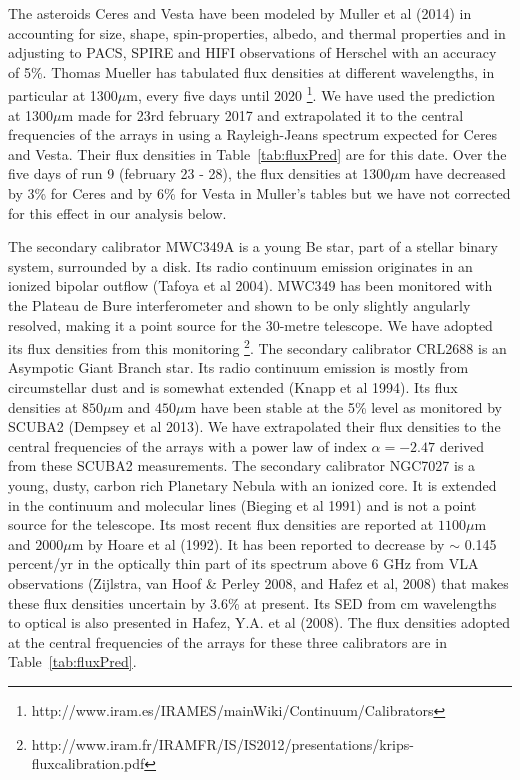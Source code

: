 The asteroids Ceres and Vesta have been modeled by Muller et al (2014) in accounting for 
size, shape, spin-properties, albedo, and thermal properties and in adjusting to PACS, SPIRE and HIFI observations
of Herschel with an accuracy of 5\%. 
Thomas Mueller has tabulated flux densities at different wavelengths, in particular at 1300$\mu$m, every five days
until 2020 \footnote{http://www.iram.es/IRAMES/mainWiki/Continuum/Calibrators}.
We have used the prediction at  1300$\mu$m made for  23rd february 2017
and extrapolated it  to the central frequencies of the arrays in using a Rayleigh-Jeans
spectrum expected for Ceres and Vesta. Their flux densities in
Table~\ref{tab:fluxPred} are for this date. Over the five days of  run 9 (february 23 - 28), the
flux densities  at 1300$\mu$m  have decreased by  3\% 
for Ceres and  by 6\%  for Vesta in Muller's tables but we have not corrected for this effect in our analysis below.  

The secondary calibrator MWC349A is a young Be star, part of a stellar binary system, surrounded by a disk. Its radio
continuum emission originates in an ionized bipolar outflow (Tafoya et al 2004).
MWC349 has been monitored with the  Plateau de Bure interferometer
and shown to be only slightly angularly resolved, making it a point source for the 30-metre telescope. We have adopted
its flux densities from this monitoring \footnote{http://www.iram.fr/IRAMFR/IS/IS2012/presentations/krips-fluxcalibration.pdf}.
The secondary calibrator CRL2688 is an Asympotic Giant Branch star. Its radio continuum emission is mostly from circumstellar dust and
is somewhat extended  (Knapp et al 1994).
Its flux densities at $850\mu$m  and $450\mu$m  have been stable at the 5\% level as monitored by SCUBA2 (Dempsey et al 2013).
We have extrapolated their flux densities to the central frequencies
of the arrays with a power law of index $\alpha=-2.47$ derived from these SCUBA2 measurements.
The secondary calibrator NGC7027 is a young, dusty, carbon rich Planetary Nebula with an ionized core.
It is extended in the continuum and molecular lines (Bieging et al 1991) and  is not a point source for the telescope.
Its  most recent flux densities are reported at $1100\mu$m  and $2000\mu$m by Hoare et al (1992). It has been reported
to decrease by $\sim$ 0.145 percent/yr in the optically thin part of its spectrum above  $6$ GHz from VLA
observations (Zijlstra, van Hoof \& Perley 2008, and Hafez et al, 2008) that makes these flux densities uncertain by 3.6\%
at present. Its SED from cm wavelengths to optical is also presented in Hafez, Y.A. et al (2008).
The flux densities adopted at the central frequencies of the arrays for these three calibrators are in Table~\ref{tab:fluxPred}.





